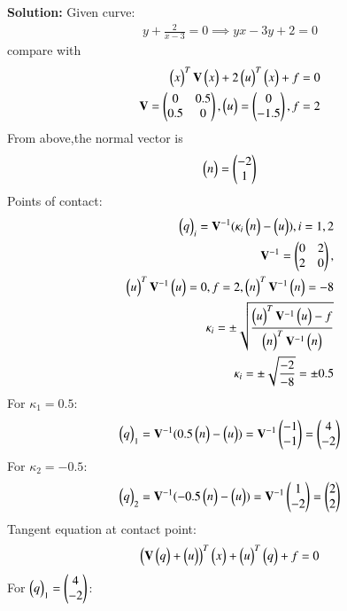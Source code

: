 \documentclass[journal]{IEEEtran}
\begin{document}
\textbf{Solution:}
Given curve:
\begin{align}
y + \frac{2}{x-3} = 0
\implies yx - 3y + 2 = 0
\end{align}
compare with
\begin{align}
\myvec{x}^T \mathbf{V} \myvec{x} + 2\myvec{u}^T \myvec{x} + f = 0 \\
\mathbf{V} = \begin{pmatrix} 0 & 0
.5 \\ 0.5 & 0 \end{pmatrix},\myvec{u} = \myvec{0 \\ -1.5},f = 2
\end{align}
From above,the normal vector is
\begin{align}
\myvec{n} = \myvec{-2 \\ 1}
\end{align}
Points of contact: 
\begin{align}
\myvec{q}_i = \mathbf{V}^{-1}(\kappa_i \myvec{n} - \myvec{u}),i = 1,2 \\
\mathbf{V}^{-1} = \begin{pmatrix} 0 & 2 \\ 2 & 0 \end{pmatrix}, \\
\myvec{u}^T \mathbf{V}^{-1} \myvec{u} = 0,f = 2,\myvec{n}^T \mathbf{V}^{-1} \myvec{n} = -8\\
\kappa_i = \pm \sqrt{\frac{\myvec{u}^T \mathbf{V}^{-1} \myvec{u} - f}{\myvec{n}^T \mathbf{V}^{-1} \myvec{n}}} \\
\kappa_i = \pm \sqrt{ \frac{-2}{-8} } = \pm 0.5  
\end{align}
For $\kappa_1 = 0.5$: 
\begin{align}
\myvec{q}_1 = \mathbf{V}^{-1}(0.5\myvec{n} - \myvec{u}) = \mathbf{V}^{-1}\myvec{-1 \\ -1} = \myvec{4 \\ -2} 
\end{align}
For $\kappa_2 = -0.5$:  
\begin{align}
\myvec{q}_2 = \mathbf{V}^{-1}(-0.5\myvec{n} - \myvec{u}) = \mathbf{V}^{-1}\myvec{1 \\ -2} = \myvec{2 \\ 2} 
\end{align}
Tangent equation at contact point:
\begin{align}
\brak{\mathbf{V}\myvec{q}+\myvec{u}}^T\myvec{x}+\myvec{u}^T\myvec{q}+f =0
\end{align}
For $\myvec{q}_1 =\myvec{4 \\ -2}$:
\end{document}
